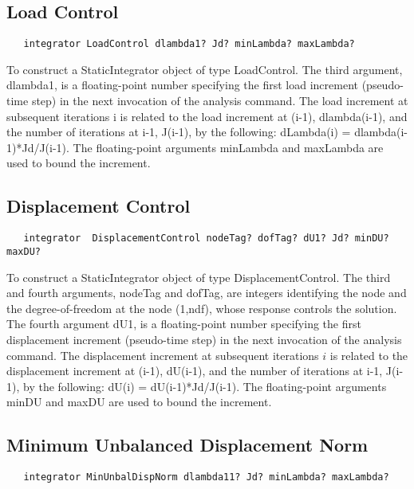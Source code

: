 \documentclass[12pt]{article}
\begin{document}
\subsection{Load Control}

{\sf\small
\begin{verbatim}
   integrator LoadControl dlambda1? Jd? minLambda? maxLambda?
\end{verbatim}
}

To construct a StaticIntegrator object of type LoadControl. The third
argument, dlambda1, is a floating-point number specifying the first
load increment (pseudo-time step) in the next invocation of the
analysis command. The load increment at subsequent iterations i is
related to the load increment at (i-1), dlambda(i-1), and the number
of iterations at i-1, J(i-1), by the following: dLambda(i) =
dlambda(i-1)*Jd/J(i-1). The floating-point arguments minLambda and
maxLambda are used to bound the increment.

\subsection{Displacement Control}

{\sf\small
\begin{verbatim}
   integrator  DisplacementControl nodeTag? dofTag? dU1? Jd? minDU? maxDU?
\end{verbatim}
}

To construct a StaticIntegrator object of type DisplacementControl. The third
and fourth arguments, nodeTag and dofTag, are integers identifying the
node and the degree-of-freedom at the node (1,ndf), whose response
controls the solution. The fourth argument dU1, is a floating-point
number specifying the first displacement increment (pseudo-time step)
in the next invocation of the analysis command. The displacement
increment at subsequent iterations $i$ is related to the displacement
increment at (i-1), dU(i-1), and the number of iterations at i-1,
J(i-1), by the following: dU(i) = dU(i-1)*Jd/J(i-1). The
floating-point arguments minDU and maxDU are used to bound the
increment.

\subsection{Minimum Unbalanced Displacement Norm}

{\sf\small
\begin{verbatim}
   integrator MinUnbalDispNorm dlambda11? Jd? minLambda? maxLambda?
\end{verbatim}
}
\end{document}
